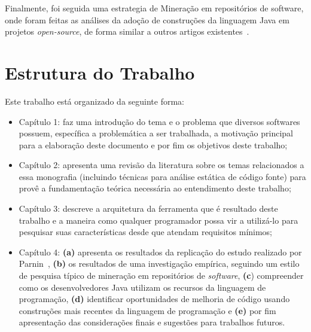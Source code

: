 Finalmente, foi seguida uma estrategia de Mineração em repositórios de software, onde foram feitas as análises da adoção de construções da linguagem Java em projetos \textit{open-source}, de forma similar a outros artigos existentes~\cite{pinto-jss:2015,Schaefer:ACM2009, Schaefer:ACM2010, Overbey:2009}.


\section{Estrutura do Trabalho}

 Este trabalho está organizado da seguinte forma:
	\begin{itemize}
		\item Capítulo 1: faz uma introdução do tema e o problema que diversos softwares possuem, específica a problemática a ser trabalhada, a motivação principal para a elaboração deste documento e por fim os objetivos deste trabalho;
		
		\item Capítulo 2: apresenta uma revisão da literatura sobre os temas relacionados a essa monografia (incluindo técnicas para análise estática de código fonte) para provê a fundamentação teórica necessária ao entendimento deste trabalho;
		
		\item Capítulo 3: descreve a arquitetura da ferramenta que é resultado deste trabalho e a maneira como qualquer programador possa vir a utilizá-lo para pesquisar suas características desde que atendam requisitos mínimos;
		
		\item Capítulo 4: \textbf{(a)} apresenta os resultados da replicação do estudo realizado por Parnin~\cite{Parnin:ACM2011}, \textbf{(b)} os resultados de uma investigação empírica, seguindo um estilo de pesquisa típico de mineração em 
		repositórios de \textit{software}, \textbf{(c}) compreender como os desenvolvedores 
		Java utilizam os recursos da linguagem de programação, \textbf{(d)} identificar 
		oportunidades de melhoria de código usando construções mais 
		recentes da linguagem de programação e \textbf{(e)} por fim apresentação das considerações finais e sugestões para trabalhos futuros. 
	\end{itemize}



	
%	

